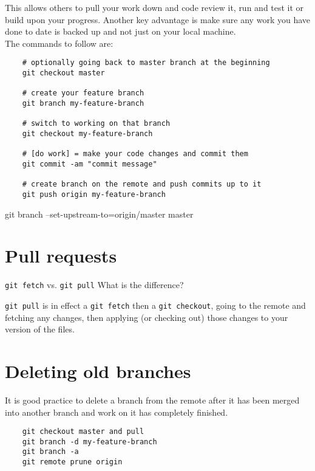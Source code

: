 This allows others to pull your work down and code review it, run and test it or build upon your progress. Another key advantage is make sure any work you have done to date is backed up and not just on your local machine.
\\

The commands to follow are:

\begin{verbatim}
    # optionally going back to master branch at the beginning
    git checkout master

    # create your feature branch
    git branch my-feature-branch 

    # switch to working on that branch
    git checkout my-feature-branch 

    # [do work] = make your code changes and commit them
    git commit -am "commit message" 

    # create branch on the remote and push commits up to it
    git push origin my-feature-branch
\end{verbatim}

git branch --set-upstream-to=origin/master master


\section{Pull requests}

\begin{infobox}{\texttt{git fetch} vs. \texttt{git pull}}
    What is the difference?

    \texttt{git pull} is in effect a \texttt{git fetch} then a \texttt{git checkout}, going to the remote and fetching any changes, then applying (or checking out) those changes to your version of the files.
\end{infobox}


\section{Deleting old branches}

It is good practice to delete a branch from the remote after it has been merged into another branch and work on it has completely finished.

\begin{verbatim}
    git checkout master and pull
    git branch -d my-feature-branch
    git branch -a
    git remote prune origin
\end{verbatim}
